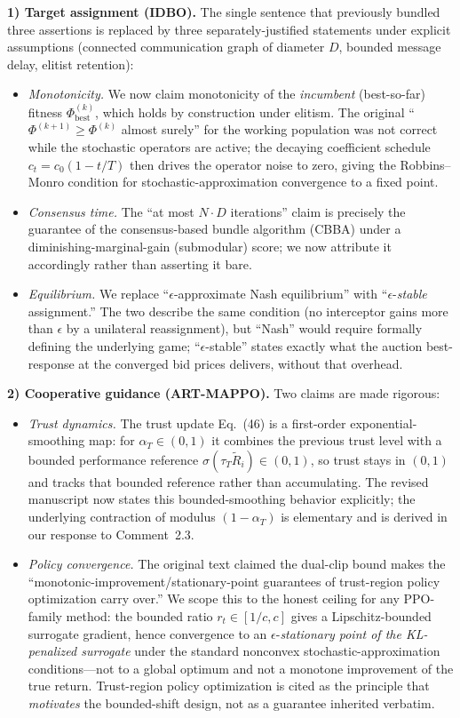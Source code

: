 \documentclass[11pt]{article}
\begin{document}
\medskip\noindent\textbf{1) Target assignment (IDBO).} The single sentence that previously
bundled three assertions is replaced by three separately-justified statements under
explicit assumptions (connected communication graph of diameter $D$, bounded message delay,
elitist retention):
\begin{itemize}
  \item \emph{Monotonicity.} We now claim monotonicity of the \emph{incumbent}
  (best-so-far) fitness $\Phi_{\mathrm{best}}^{(k)}$, which holds by construction under
  elitism. The original ``$\Phi^{(k+1)}\!\ge\!\Phi^{(k)}$ almost surely'' for the working
  population was not correct while the stochastic operators are active; the decaying
  coefficient schedule $c_t=c_0(1-t/T)$ then drives the operator noise to zero, giving the
  Robbins--Monro condition for stochastic-approximation convergence to a fixed point.
  \item \emph{Consensus time.} The ``at most $N\!\cdot\!D$ iterations'' claim is precisely
  the guarantee of the consensus-based bundle algorithm (CBBA) under a diminishing-marginal-gain
  (submodular) score; we now attribute it accordingly rather than asserting it bare.
  \item \emph{Equilibrium.} We replace ``$\epsilon$-approximate Nash equilibrium'' with
  ``$\epsilon$-\emph{stable} assignment.'' The two describe the same condition (no
  interceptor gains more than $\epsilon$ by a unilateral reassignment), but ``Nash'' would
  require formally defining the underlying game; ``$\epsilon$-stable'' states exactly what
  the auction best-response at the converged bid prices delivers, without that overhead.
\end{itemize}

\medskip\noindent\textbf{2) Cooperative guidance (ART-MAPPO).} Two claims are made rigorous:
\begin{itemize}
  \item \emph{Trust dynamics.} The trust update Eq.~(46) is a first-order exponential-smoothing
  map: for $\alpha_T\in(0,1)$ it combines the previous trust level with a bounded performance
  reference $\sigma(\tau_T\tilde R_i)\in(0,1)$, so trust stays in $(0,1)$ and tracks that
  bounded reference rather than accumulating. The revised manuscript now states this
  bounded-smoothing behavior explicitly; the underlying contraction of modulus $(1-\alpha_T)$
  is elementary and is derived in our response to Comment~2.3.
  \item \emph{Policy convergence.} The original text claimed the dual-clip bound makes the
  ``monotonic-improvement/stationary-point guarantees of trust-region policy optimization
  carry over.'' We scope this to the honest ceiling for any PPO-family method: the bounded
  ratio $r_t\in[1/c,c]$ gives a Lipschitz-bounded surrogate gradient, hence convergence to
  an $\epsilon$-\emph{stationary point of the KL-penalized surrogate} under the standard
  nonconvex stochastic-approximation conditions---not to a global optimum and not a monotone
  improvement of the true return. Trust-region policy optimization is cited as the principle
  that \emph{motivates} the bounded-shift design, not as a guarantee inherited verbatim.
\end{itemize}
\end{document}
